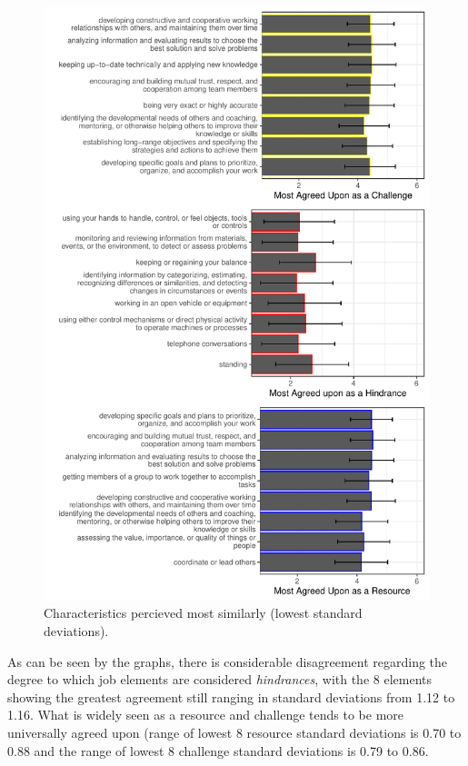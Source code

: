 \documentclass[
  english,
  man]{apa6}
\begin{document}
\begin{figure}
\centering
\includegraphics{Submission_files/figure-latex/combinegraphs-1.pdf}
\caption{\label{fig:combinegraphs}Characteristics percieved most similarly (lowest standard deviations).}
\end{figure}

As can be seen by the graphs, there is considerable disagreement regarding the degree to which job elements are considered \emph{hindrances}, with the 8 elements showing the greatest agreement still ranging in standard deviations from 1.12 to 1.16. What is widely seen as a resource and challenge tends to be more universally agreed upon (range of lowest 8 resource standard deviations is 0.70 to 0.88 and the range of lowest 8 challenge standard deviations is 0.79 to 0.86.
\end{document}
